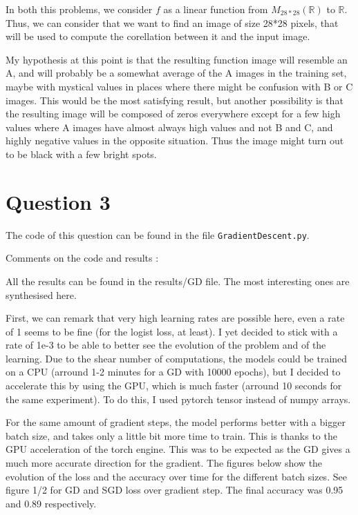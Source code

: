 \documentclass{article}
\begin{document}
In both this problems, we consider $f$ as a linear function from $M_{28*28}(\mathbb{R})$ to $\mathbb{R}$. Thus, we can consider that we want to find an image of size 28*28 pixels, that will be used to compute the corellation between it and the input image.

My hypothesis at this point is that the resulting function image will resemble an A, and will probably be a somewhat average of the A images in the training set, maybe with mystical values in places where there might be confusion with B or C images. This would be the most satisfying result, but another possibility is that the resulting image will be composed of zeros everywhere except for a few high values where A images have almost always high values and not B and C, and highly negative values in the opposite situation. Thus the image might turn out to be black with a few bright spots.

\section{Question 3}

The code of this question can be found in the file \texttt{GradientDescent.py}.\newline

Comments on the code and results :\newline

All the results can be found in the results/GD file. The most interesting ones are synthesised here.

First, we can remark that very high learning rates are possible here, even a rate of 1 seems to be fine (for the logist loss, at least). I yet decided to stick with a rate of 1e-3 to be able to better see the evolution of the problem and of the learning.
Due to the shear number of computations, the models could be trained on a CPU (arround 1-2 minutes for a GD with 10000 epochs), but I decided to accelerate this by using the GPU, which is much faster (arround 10 seconds for the same experiment). To do this, I used pytorch tensor instead of numpy arrays.

For the same amount of gradient steps, the model performs better with a bigger batch size, and takes only a little bit more time to train. This is thanks to the GPU acceleration of the torch engine.
This was to be expected as the GD gives a much more accurate direction for the gradient.
The figures below show the evolution of the loss and the accuracy over time for the different batch sizes.
See figure 1/2 for GD and SGD loss over gradient step. The final accuracy was 0.95 and 0.89 respectively.
\end{document}
